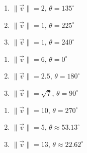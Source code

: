 \documentclass{ximera}
\begin{document}
\begin{multicols}{3}

\begin{enumerate}

\setcounter{enumi}{\value{HW}}

\item $\|\vec{v}\| = 2$, $\theta = 135^{\circ}$
\item $\|\vec{v}\| = 1$, $\theta = 225^{\circ}$
\item $\|\vec{v}\| = 1$, $\theta = 240^{\circ}$

\setcounter{HW}{\value{enumi}}

\end{enumerate}

\end{multicols}

\begin{multicols}{3}

\begin{enumerate}

\setcounter{enumi}{\value{HW}}

\item  $\|\vec{v}\| = 6$, $\theta = 0^{\circ}$
\item $\|\vec{v}\| = 2.5$, $\theta = 180^{\circ}$
\item  $\|\vec{v}\| = \sqrt{7}$, $\theta = 90^{\circ}$

\setcounter{HW}{\value{enumi}}

\end{enumerate}

\end{multicols}

\begin{multicols}{3}

\begin{enumerate}

\setcounter{enumi}{\value{HW}}

\item  $\|\vec{v}\| = 10$, $\theta = 270^{\circ}$
\item $\|\vec{v}\| = 5$, $\theta \approx 53.13^{\circ}$
\item $\|\vec{v}\| = 13$, $\theta \approx 22.62^{\circ}$

\setcounter{HW}{\value{enumi}}

\end{enumerate}

\end{multicols}
\end{document}
